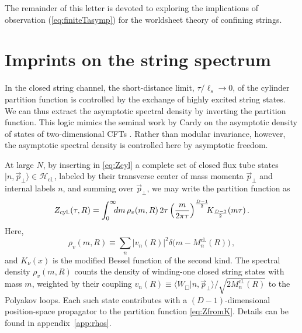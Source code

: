 \documentclass[
 reprint,
 amsmath,
 pre,
 amssymb,
 nofootinbib,
 aps,
 longbibliography,
]{revtex4-1}
\newcommand{\<}{{\langle}}
\renewcommand{\>}{{\rangle}}
\begin{document}
The remainder of this letter is devoted to exploring the implications of observation (\ref{eq:finiteTasymp}) for the worldsheet theory of confining strings.


\section{Imprints on the string spectrum}
\label{sec:cardysec}

In the closed string channel, the short-distance limit, $\tau/\ell_s\to 0$, of the cylinder partition function is controlled by the exchange of highly excited string states. We can thus extract the asymptotic spectral density by inverting the partition function. This logic mimics the seminal work by Cardy on the asymptotic density of states of two-dimensional CFTs \cite{Cardy:1986ie}. Rather than modular invariance, however, the asymptotic spectral density is controlled here by asymptotic freedom.

At large $N$, by inserting in \eqref{eq:Zcyl} a complete set of closed flux tube states $|n,\vec p_\bot\rangle \in \mathcal H_{\text{cl.}}$, labeled by their transverse center of mass momenta $\vec p_\bot$ and internal labels $n$, and summing over $\vec p_\bot$, we may write the partition function as \cite{Luscher:2004ib,Aharony:2010cx}
\begin{equation}\label{eq:ZfromK}
    Z_{\text{cyl.}}(\tau,R) = \int_0^\infty \hspace{-5pt} d m\, \rho_v( m,R)\, 2\tau \left(\frac{ m}{2\pi \tau}\right)^{\frac{D-1}{2}} \hspace{-5pt}K_{\frac{D-3}{2}}( m \tau)\,.
\end{equation}
Here,
\begin{equation}\label{eq:rho_B}
    \rho_v( m ,R) \equiv \sum_n |v_n(R)|^2 \delta\big( m - M_n^{\text{cl.}}(R)\big)\,,
\end{equation}
and $K_\nu(x)$ is the modified Bessel function of the second kind. The spectral density $\rho_v( m,R)$ counts the density of winding-one closed string states with mass $ m$, weighted by their coupling $v_n(R)\equiv \langle W_{\Box}|n,\vec p_\bot\rangle/\sqrt{2M^{\text{cl.}}_n(R)}$ to the Polyakov loops. Each such state contributes with a ${(D-1)}$-dimensional position-space propagator to the partition function \eqref{eq:ZfromK}. Details can be found in  appendix~\ref{app:rhos}.
\end{document}
